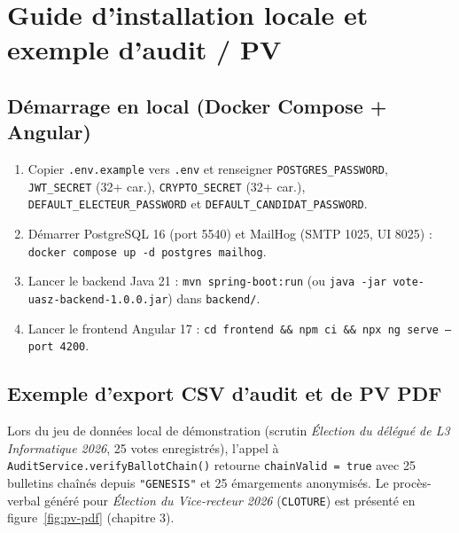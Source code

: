 \chapter{Guide d'installation locale et exemple d'audit / PV}

\section{Démarrage en local (Docker Compose + Angular)}
\begin{enumerate}
    \item Copier \texttt{.env.example} vers \texttt{.env} et renseigner \texttt{POSTGRES\_PASSWORD}, \texttt{JWT\_SECRET} (32+ car.), \texttt{CRYPTO\_SECRET} (32+ car.), \texttt{DEFAULT\_ELECTEUR\_PASSWORD} et \texttt{DEFAULT\_CANDIDAT\_PASSWORD}.
    \item Démarrer PostgreSQL 16 (port 5540) et MailHog (SMTP 1025, UI 8025) : \texttt{docker compose up -d postgres mailhog}.
    \item Lancer le backend Java 21 : \texttt{mvn spring-boot:run} (ou \texttt{java -jar vote-uasz-backend-1.0.0.jar}) dans \texttt{backend/}.
    \item Lancer le frontend Angular 17 : \texttt{cd frontend \&\& npm ci \&\& npx ng serve --port 4200}.
\end{enumerate}

\section{Exemple d'export CSV d'audit et de PV PDF}
Lors du jeu de données local de démonstration (scrutin \textit{Élection du délégué de L3 Informatique 2026}, 25 votes enregistrés), l'appel à \texttt{AuditService.verifyBallotChain()} retourne \texttt{chainValid = true} avec 25 bulletins chaînés depuis \texttt{"GENESIS"} et 25 émargements anonymisés. Le procès-verbal généré pour \textit{Élection du Vice-recteur 2026} (\texttt{CLOTURE}) est présenté en figure~\ref{fig:pv-pdf} (chapitre 3).
